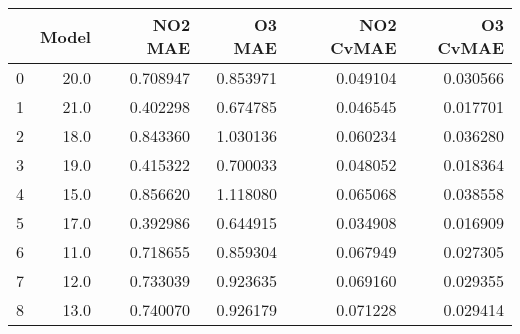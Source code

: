 \begin{tabular}{lrrrrr}
\toprule
{} &  Model &   NO2 MAE &    O3 MAE &  NO2 CvMAE &  O3 CvMAE \\
\midrule
0 &   20.0 &  0.708947 &  0.853971 &   0.049104 &  0.030566 \\
1 &   21.0 &  0.402298 &  0.674785 &   0.046545 &  0.017701 \\
2 &   18.0 &  0.843360 &  1.030136 &   0.060234 &  0.036280 \\
3 &   19.0 &  0.415322 &  0.700033 &   0.048052 &  0.018364 \\
4 &   15.0 &  0.856620 &  1.118080 &   0.065068 &  0.038558 \\
5 &   17.0 &  0.392986 &  0.644915 &   0.034908 &  0.016909 \\
6 &   11.0 &  0.718655 &  0.859304 &   0.067949 &  0.027305 \\
7 &   12.0 &  0.733039 &  0.923635 &   0.069160 &  0.029355 \\
8 &   13.0 &  0.740070 &  0.926179 &   0.071228 &  0.029414 \\
\bottomrule
\end{tabular}
